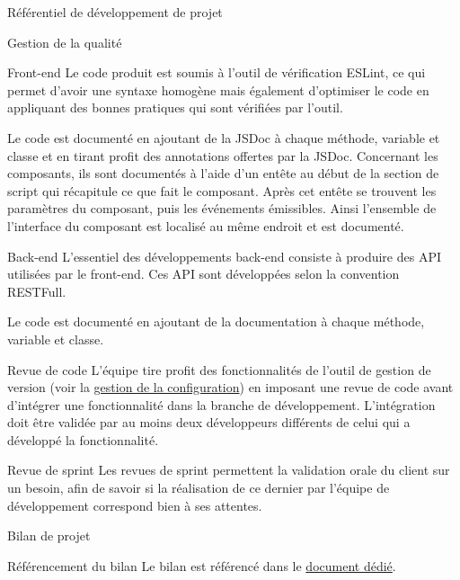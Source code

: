 \documentclass[]{article}
\begin{document}
{\begin{section}{\label{sec:Référentiel de développement de projet}Référentiel de développement de projet}
     \begin{subsection}{\label{sec:Gestion de la qualité}Gestion de la qualité}
         \begin{subsubsection}{\label{sec:Front-end}Front-end}
             Le code produit est soumis à l’outil de vérification ESLint, ce qui permet d’avoir une syntaxe homogène mais également d’optimiser le code en appliquant des bonnes pratiques qui sont vérifiées par l’outil.

             Le code est documenté en ajoutant de la JSDoc à chaque méthode, variable et classe et en tirant profit des annotations offertes par la JSDoc. Concernant les composants, ils sont documentés à l’aide d’un entête au début de la section de script qui récapitule ce que fait le composant. Après cet entête se trouvent les paramètres du composant, puis les événements émissibles. Ainsi l’ensemble de l’interface du composant est localisé au même endroit et est documenté.
         \end{subsubsection}

         \begin{subsubsection}{\label{sec:Back-end}Back-end}
             L’essentiel des développements back-end consiste à produire des API utilisées par le front-end. Ces API sont développées selon la convention RESTFull.

             Le code est documenté en ajoutant de la documentation à chaque méthode, variable et classe.
         \end{subsubsection}

\newpage

         \begin{subsubsection}{\label{sec:Revue de code}Revue de code}
             L’équipe tire profit des fonctionnalités de l’outil de gestion de version (voir la \hyperref[sec:Gestion de la configuration]{gestion de la configuration}) en imposant une revue de code avant d’intégrer une fonctionnalité dans la branche de développement. L’intégration doit être validée par au moins deux développeurs différents de celui qui a développé la fonctionnalité.
         \end{subsubsection}

         \begin{subsubsection}{\label{sec:Revue de sprint}Revue de sprint}
             Les revues de sprint permettent la validation orale du client sur un besoin, afin de savoir si la réalisation de ce dernier par l’équipe de développement correspond bien à ses attentes.
         \end{subsubsection}
     \end{subsection}
    \end{section}

    \begin{section}{\label{sec:Bilan de projet}Bilan de projet}
     \begin{subsection}{\label{sec:Référencement du bilan}Référencement du bilan}
         Le bilan est référencé dans le \href{documents/Bilan_de_projet.pdf}{document dédié}.
     \end{subsection}
    \end{section}
}
\end{document}
